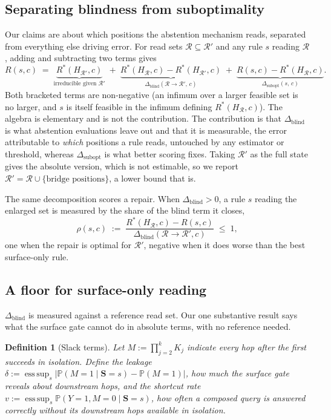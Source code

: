 \documentclass{article}
\newtheorem{definition}{Definition}
\newcommand{\esssup}{\operatorname*{ess\,sup}}
\newcommand{\gate}{\mathbf{S}}
\begin{document}
\subsection{Separating blindness from suboptimality}

Our claims are about which positions the abstention mechanism reads, separated from everything else
driving error. For read sets $\mathcal{R}\subseteq\mathcal{R}'$ and any rule $s$
reading $\mathcal{R}$, adding and subtracting two terms gives
\[
R(s,c)\;=\;\underbrace{R^\ast(H_{\mathcal{R}'},c)}_{\text{irreducible given }\mathcal{R}'}
\;+\;\underbrace{R^\ast(H_{\mathcal{R}},c)-R^\ast(H_{\mathcal{R}'},c)}_{\Delta_{\mathrm{blind}}(\mathcal{R}\to\mathcal{R}',\,c)}
\;+\;\underbrace{R(s,c)-R^\ast(H_{\mathcal{R}},c)}_{\Delta_{\mathrm{subopt}}(s,\,c)} .
\]
Both bracketed terms are non-negative (an infimum over a larger feasible set is no larger, and $s$ is
itself feasible in the infimum defining $R^\ast(H_{\mathcal{R}},c)$). The algebra is elementary and is
not the contribution. The contribution is that $\Delta_{\mathrm{blind}}$ is what abstention
evaluations leave out and that it is measurable, the error attributable to \emph{which} positions a
rule reads, untouched by any estimator or threshold, whereas $\Delta_{\mathrm{subopt}}$ is what better
scoring fixes. Taking $\mathcal{R}'$ as the full state gives the absolute version, which is not
estimable, so we report $\mathcal{R}'=\mathcal{R}\cup\{\text{bridge positions}\}$, a lower bound that
is.

The same decomposition scores a repair. When $\Delta_{\mathrm{blind}}>0$, a rule $s$ reading the
enlarged set is measured by the share of the blind term it closes,
\[
\rho(s,c)\;:=\;\frac{R^\ast(H_{\mathcal{R}},c)-R(s,c)}{\Delta_{\mathrm{blind}}(\mathcal{R}\to\mathcal{R}',c)}\;\le\;1,
\]
one when the repair is optimal for $\mathcal{R}'$, negative when it does worse than the best
surface-only rule.

\subsection{A floor for surface-only reading}

$\Delta_{\mathrm{blind}}$ is measured against a reference read set. Our one substantive result says
what the surface gate cannot do in absolute terms, with no reference needed.

\begin{definition}[Slack terms]
\label{def:slack}
Let $M:=\prod_{j=2}^{k}K_j$ indicate every hop after the first succeeds in isolation. Define the
\emph{leakage} $\delta:=\esssup_s|\mathbb{P}(M=1\mid\gate=s)-\mathbb{P}(M=1)|$, how much the surface
gate reveals about downstream hops, and the \emph{shortcut rate}
$v:=\esssup_s\mathbb{P}(Y=1,M=0\mid\gate=s)$, how often a composed query is answered correctly
without its downstream hops available in isolation.
\end{definition}
\end{document}
